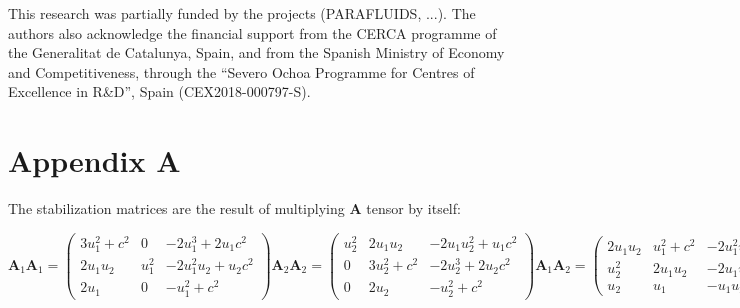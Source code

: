 \documentclass[a4paper,12pt]{article}
\begin{document}
This research was partially funded by the projects (PARAFLUIDS, ...). The authors also acknowledge the financial support from the CERCA programme of the Generalitat de Catalunya, Spain, and from the Spanish Ministry of Economy and Competitiveness, through the “Severo Ochoa Programme for Centres of Excellence in R\&D”, Spain (CEX2018-000797-S).



\section*{Appendix A}

The stabilization matrices are the result of multiplying $\mathbf{A}$ tensor by itself:

\begin{subequations}
\begin{equation}
\mathbf{A}_1\mathbf{A}_1 =
\begin{pmatrix}
3u_1^2 + c^2 & 0  & -2u_1^3 + 2u_1c^2 \\
2u_1u_2  & u_1^2  & -2u_1^2u_2 + u_2c^2 \\
2u_1  & 0   & -u_1^2 + c^2
\end{pmatrix}
\end{equation}
\begin{equation}
    \mathbf{A}_2\mathbf{A}_2 =
\begin{pmatrix}
u_2^2  & 2u_1u_2  & -2u_1u_2^2 + u_1c^2 \\
0    & 3u_2^2 + c^2 & -2u_2^3 + 2u_2c^2 \\
0  & 2u_2  & -u_2^2 + c^2
\end{pmatrix}
\end{equation}
\begin{equation}
\mathbf{A}_1\mathbf{A}_2 =
\begin{pmatrix}
2u_1u_2  & u_1^2 + c^2  & -2u_1^2u_2 \\
u_2^2  & 2u_1u_2  & -2u_1u_2^2 + u_1c^2 \\
u_2  & u_1  & -u_1u_2
\end{pmatrix}
\end{equation}
\begin{equation}
\mathbf{A}_2\mathbf{A}_1 =
\begin{pmatrix}
2u_1u_2  & u_1^2  & -2u_1^2u_2 + u_2c^2 \\
u_2^2 + c^2  & 2u_1u_2  & -2u_1u_2^2 \\
u_2  & u_1  & -u_1u_2
\end{pmatrix}
\end{equation}
\end{subequations}




\end{document}
